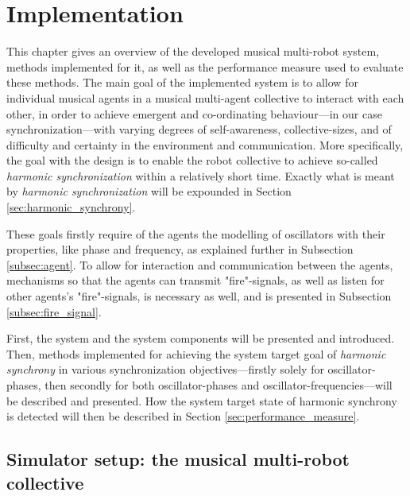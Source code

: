\chapter{Implementation}
\label{chap:implementation}

This chapter gives an overview of the developed musical multi-robot system, methods implemented for it, as well as the performance measure used to evaluate these methods. The main goal of the implemented system is to allow for individual musical agents in a musical multi-agent collective to interact with each other, in order to achieve emergent and co-ordinating behaviour—in our case synchronization—with varying degrees of self-awareness, collective-sizes, and of difficulty and certainty in the environment and communication. More specifically, the goal with the design is to enable the robot collective to achieve so-called \textit{harmonic synchronization} within a relatively short time. Exactly what is meant by \textit{harmonic synchronization} will be expounded in Section \ref{sec:harmonic_synchrony}.

These goals firstly require of the agents the modelling of oscillators with their properties, like phase and frequency, as explained further in Subsection \ref{subsec:agent}. To allow for interaction and communication between the agents, mechanisms so that the agents can transmit "fire"-signals, as well as listen for other agents's "fire"-signals, is necessary as well, and is presented in Subsection \ref{subsec:fire_signal}.

First, the system and the system components will be presented and introduced. Then, methods implemented for achieving the system target goal of \textit{harmonic synchrony} in various synchronization objectives—firstly solely for oscillator-phases, then secondly for both oscillator-phases and oscillator-frequencies—will be described and presented. How the system target state of harmonic synchrony is detected will then be described in Section \ref{sec:performance_measure}.




\section{Simulator setup: the musical multi-robot collective}
\label{sec:developed_system}


